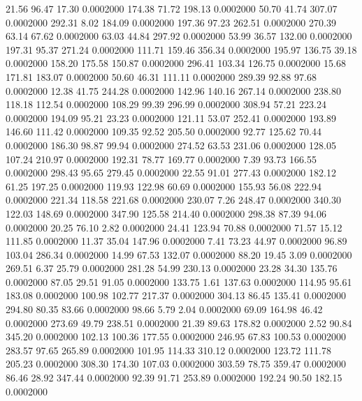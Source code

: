   21.56   96.47   17.30   0.0002000
 174.38   71.72  198.13   0.0002000
  50.70   41.74  307.07   0.0002000
 292.31    8.02  184.09   0.0002000
 197.36   97.23  262.51   0.0002000
 270.39   63.14   67.62   0.0002000
  63.03   44.84  297.92   0.0002000
  53.99   36.57  132.00   0.0002000
 197.31   95.37  271.24   0.0002000
 111.71  159.46  356.34   0.0002000
 195.97  136.75   39.18   0.0002000
 158.20  175.58  150.87   0.0002000
 296.41  103.34  126.75   0.0002000
  15.68  171.81  183.07   0.0002000
  50.60   46.31  111.11   0.0002000
 289.39   92.88   97.68   0.0002000
  12.38   41.75  244.28   0.0002000
 142.96  140.16  267.14   0.0002000
 238.80  118.18  112.54   0.0002000
 108.29   99.39  296.99   0.0002000
 308.94   57.21  223.24   0.0002000
 194.09   95.21   23.23   0.0002000
 121.11   53.07  252.41   0.0002000
 193.89  146.60  111.42   0.0002000
 109.35   92.52  205.50   0.0002000
  92.77  125.62   70.44   0.0002000
 186.30   98.87   99.94   0.0002000
 274.52   63.53  231.06   0.0002000
 128.05  107.24  210.97   0.0002000
 192.31   78.77  169.77   0.0002000
   7.39   93.73  166.55   0.0002000
 298.43   95.65  279.45   0.0002000
  22.55   91.01  277.43   0.0002000
 182.12   61.25  197.25   0.0002000
 119.93  122.98   60.69   0.0002000
 155.93   56.08  222.94   0.0002000
 221.34  118.58  221.68   0.0002000
 230.07    7.26  248.47   0.0002000
 340.30  122.03  148.69   0.0002000
 347.90  125.58  214.40   0.0002000
 298.38   87.39   94.06   0.0002000
  20.25   76.10    2.82   0.0002000
  24.41  123.94   70.88   0.0002000
  71.57   15.12  111.85   0.0002000
  11.37   35.04  147.96   0.0002000
   7.41   73.23   44.97   0.0002000
  96.89  103.04  286.34   0.0002000
  14.99   67.53  132.07   0.0002000
  88.20   19.45    3.09   0.0002000
 269.51    6.37   25.79   0.0002000
 281.28   54.99  230.13   0.0002000
  23.28   34.30  135.76   0.0002000
  87.05   29.51   91.05   0.0002000
 133.75    1.61  137.63   0.0002000
 114.95   95.61  183.08   0.0002000
 100.98  102.77  217.37   0.0002000
 304.13   86.45  135.41   0.0002000
 294.80   80.35   83.66   0.0002000
  98.66    5.79    2.04   0.0002000
  69.09  164.98   46.42   0.0002000
 273.69   49.79  238.51   0.0002000
  21.39   89.63  178.82   0.0002000
   2.52   90.84  345.20   0.0002000
 102.13  100.36  177.55   0.0002000
 246.95   67.83  100.53   0.0002000
 283.57   97.65  265.89   0.0002000
 101.95  114.33  310.12   0.0002000
 123.72  111.78  205.23   0.0002000
 308.30  174.30  107.03   0.0002000
 303.59   78.75  359.47   0.0002000
  86.46   28.92  347.44   0.0002000
  92.39   91.71  253.89   0.0002000
 192.24   90.50  182.15   0.0002000
